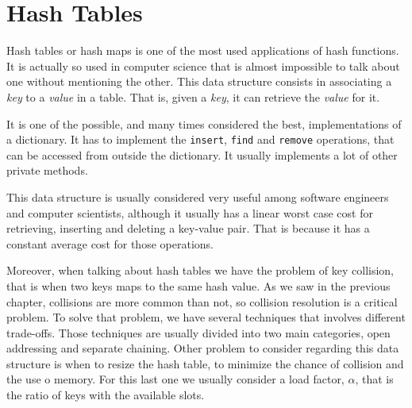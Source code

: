 
\chapter{Hash Tables}
\label{cap:Hash Tables}



Hash tables or hash maps is one of the most used applications of hash functions. It is actually so used in computer science that is almost impossible to talk about one without mentioning the other. This data structure consists in associating a \textit{key} to a \textit{value} in a table. That is, given a \textit{key}, it can retrieve the  \textit{value} for it.

It is one of the possible, and many times considered the best, implementations of a dictionary. It has to implement the \texttt{insert}, \texttt{find} and \texttt{remove} operations, that can be accessed from outside the dictionary. It usually implements a lot of other private methods. 

This data structure is usually considered very useful among software engineers and computer scientists, although it usually has a linear worst case cost for retrieving, inserting and deleting a key-value pair. That is because it has a constant average cost for those operations.

Moreover, when talking about hash tables we have the problem of key collision, that is when two keys maps to the same hash value. As we saw in the previous chapter, collisions are more common than not, so collision resolution is a critical problem. To solve that problem, we have several techniques that involves different trade-offs. Those techniques are usually divided into two main categories, open addressing and separate chaining. Other problem to consider regarding this data structure is when to resize the hash table, to minimize the chance of collision and the use o memory. For this last one we usually consider a load factor, \( \alpha \), that is the ratio of keys with the available slots.

